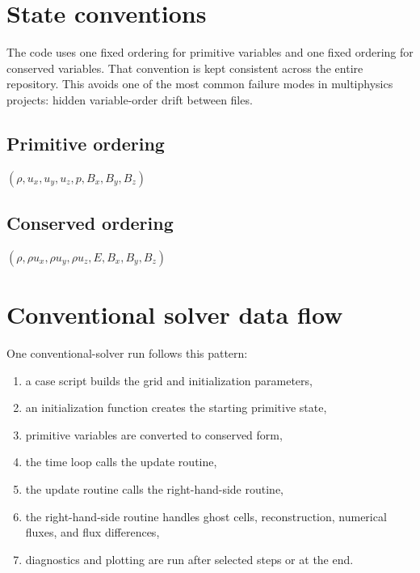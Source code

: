 \documentclass[11pt]{article}
\begin{document}
\section{State conventions}
The code uses one fixed ordering for primitive variables and one fixed ordering for conserved variables. That convention is kept consistent across the entire repository. This avoids one of the most common failure modes in multiphysics projects: hidden variable-order drift between files.

\subsection{Primitive ordering}
\begin{center}
$(\rho, u_x, u_y, u_z, p, B_x, B_y, B_z)$
\end{center}

\subsection{Conserved ordering}
\begin{center}
$(\rho, \rho u_x, \rho u_y, \rho u_z, E, B_x, B_y, B_z)$
\end{center}

\section{Conventional solver data flow}
One conventional-solver run follows this pattern:
\begin{enumerate}[leftmargin=1.8em]
    \item a case script builds the grid and initialization parameters,
    \item an initialization function creates the starting primitive state,
    \item primitive variables are converted to conserved form,
    \item the time loop calls the update routine,
    \item the update routine calls the right-hand-side routine,
    \item the right-hand-side routine handles ghost cells, reconstruction, numerical fluxes, and flux differences,
    \item diagnostics and plotting are run after selected steps or at the end.
\end{enumerate}
\end{document}
